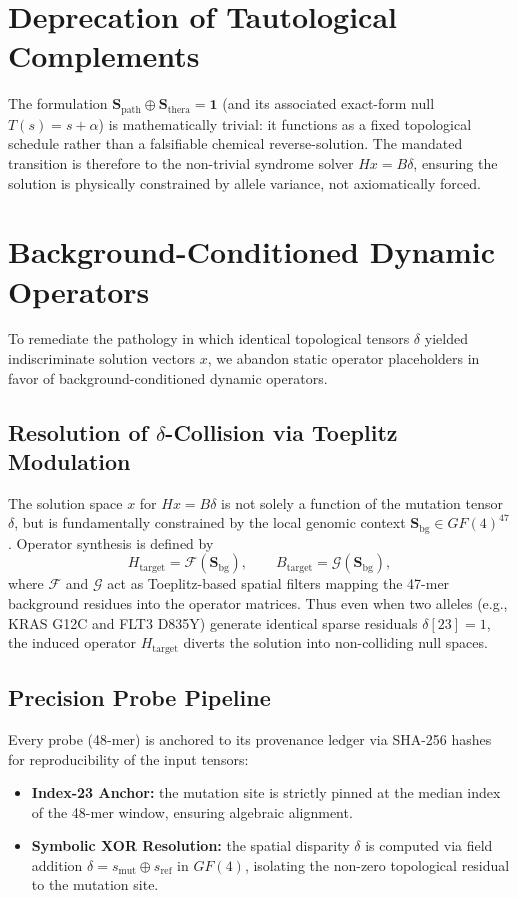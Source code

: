 \documentclass[11pt]{article}
\begin{document}
\section{Deprecation of Tautological Complements}
The formulation \(\mathbf{S}_{\mathrm{path}}\oplus\mathbf{S}_{\mathrm{thera}}=\mathbf{1}\)
(and its associated exact-form null \(T(s)=s+\alpha\)) is mathematically
trivial: it functions as a fixed topological schedule rather than a
falsifiable chemical reverse-solution. The mandated transition is therefore to
the non-trivial syndrome solver \(Hx=B\delta\), ensuring the solution is
physically constrained by allele variance, not axiomatically forced.

\section{Background-Conditioned Dynamic Operators}
To remediate the pathology in which identical topological tensors \(\delta\)
yielded indiscriminate solution vectors \(x\), we abandon static operator
placeholders in favor of background-conditioned dynamic operators.

\subsection{Resolution of \(\delta\)-Collision via Toeplitz Modulation}
The solution space \(x\) for \(Hx=B\delta\) is not solely a function of the
mutation tensor \(\delta\), but is fundamentally constrained by the local
genomic context \(\mathbf{S}_{\mathrm{bg}}\in GF(4)^{47}\). Operator synthesis
is defined by
\begin{equation}
    H_{\mathrm{target}} = \mathcal{F}(\mathbf{S}_{\mathrm{bg}}),\qquad
    B_{\mathrm{target}} = \mathcal{G}(\mathbf{S}_{\mathrm{bg}}),
\end{equation}
where \(\mathcal{F}\) and \(\mathcal{G}\) act as Toeplitz-based spatial filters
mapping the 47-mer background residues into the operator matrices. Thus even
when two alleles (e.g., KRAS G12C and FLT3 D835Y) generate identical sparse
residuals \(\delta[23]=1\), the induced operator \(H_{\mathrm{target}}\)
diverts the solution into non-colliding null spaces.

\subsection{Precision Probe Pipeline}
Every probe (48-mer) is anchored to its provenance ledger via SHA-256 hashes
for reproducibility of the input tensors:
\begin{itemize}
    \item \textbf{Index-23 Anchor:} the mutation site is strictly pinned at the
    median index of the 48-mer window, ensuring algebraic alignment.
    \item \textbf{Symbolic XOR Resolution:} the spatial disparity \(\delta\) is
    computed via field addition \(\delta=s_{\mathrm{mut}}\oplus s_{\mathrm{ref}}\)
    in \(GF(4)\), isolating the non-zero topological residual to the mutation
    site.
\end{itemize}
\end{document}
